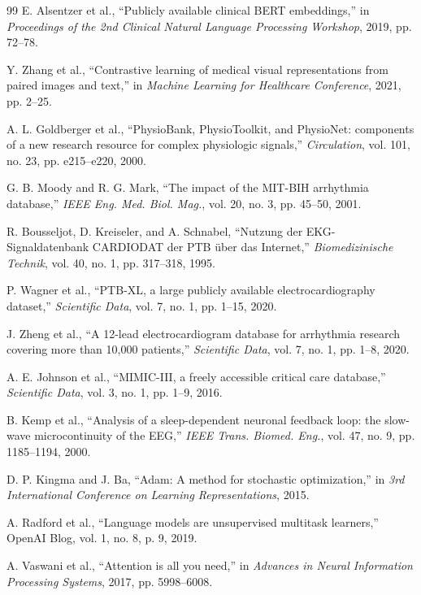 \documentclass[conference]{IEEEtran}
\begin{document}
\begin{thebibliography}{99}
E. Alsentzer et al., ``Publicly available clinical BERT embeddings,'' in \textit{Proceedings of the 2nd Clinical Natural Language Processing Workshop}, 2019, pp. 72--78.

Y. Zhang et al., ``Contrastive learning of medical visual representations from paired images and text,'' in \textit{Machine Learning for Healthcare Conference}, 2021, pp. 2--25.

A. L. Goldberger et al., ``PhysioBank, PhysioToolkit, and PhysioNet: components of a new research resource for complex physiologic signals,'' \textit{Circulation}, vol. 101, no. 23, pp. e215--e220, 2000.

G. B. Moody and R. G. Mark, ``The impact of the MIT-BIH arrhythmia database,'' \textit{IEEE Eng. Med. Biol. Mag.}, vol. 20, no. 3, pp. 45--50, 2001.

R. Bousseljot, D. Kreiseler, and A. Schnabel, ``Nutzung der EKG-Signaldatenbank CARDIODAT der PTB über das Internet,'' \textit{Biomedizinische Technik}, vol. 40, no. 1, pp. 317--318, 1995.

P. Wagner et al., ``PTB-XL, a large publicly available electrocardiography dataset,'' \textit{Scientific Data}, vol. 7, no. 1, pp. 1--15, 2020.

J. Zheng et al., ``A 12-lead electrocardiogram database for arrhythmia research covering more than 10,000 patients,'' \textit{Scientific Data}, vol. 7, no. 1, pp. 1--8, 2020.

A. E. Johnson et al., ``MIMIC-III, a freely accessible critical care database,'' \textit{Scientific Data}, vol. 3, no. 1, pp. 1--9, 2016.

B. Kemp et al., ``Analysis of a sleep-dependent neuronal feedback loop: the slow-wave microcontinuity of the EEG,'' \textit{IEEE Trans. Biomed. Eng.}, vol. 47, no. 9, pp. 1185--1194, 2000.

D. P. Kingma and J. Ba, ``Adam: A method for stochastic optimization,'' in \textit{3rd International Conference on Learning Representations}, 2015.

A. Radford et al., ``Language models are unsupervised multitask learners,'' OpenAI Blog, vol. 1, no. 8, p. 9, 2019.

A. Vaswani et al., ``Attention is all you need,'' in \textit{Advances in Neural Information Processing Systems}, 2017, pp. 5998--6008.


\end{thebibliography}
\end{document}

